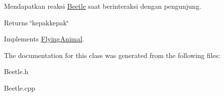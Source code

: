 Mendapatkan reaksi \hyperlink{classBeetle}{Beetle} saat berinteraksi dengan pengunjung. 

\begin{DoxyReturn}{Returns}
\char`\"{}kepakkepak\char`\"{} 
\end{DoxyReturn}


Implements \hyperlink{classFlyingAnimal_ac0eee625fa2235eee8cbdc0a010ae430}{Flying\-Animal}.



The documentation for this class was generated from the following files\-:\begin{DoxyCompactItemize}
\item 
Beetle.\-h\item 
Beetle.\-cpp\end{DoxyCompactItemize}
